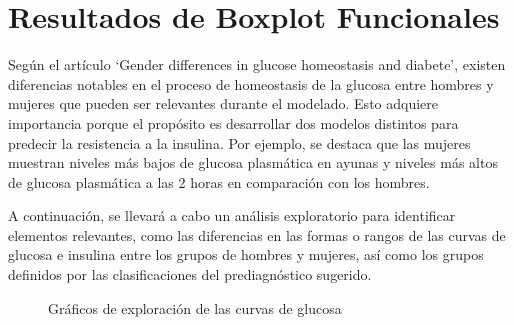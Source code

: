 \section{Resultados de Boxplot Funcionales}

Según el artículo `Gender differences in glucose homeostasis and diabete'\cite{GenderDifferences2018}, existen diferencias notables en el proceso de homeostasis de la glucosa entre hombres y mujeres que pueden ser relevantes durante el modelado. Esto adquiere importancia porque el propósito es desarrollar dos modelos distintos para predecir la resistencia a la insulina. Por ejemplo, se destaca que las mujeres muestran niveles más bajos de glucosa plasmática en ayunas y niveles más altos de glucosa plasmática a las 2 horas en comparación con los hombres.

A continuación, se llevará a cabo un análisis exploratorio para identificar elementos relevantes, como las diferencias en las formas o rangos de las curvas de glucosa e insulina entre los grupos de hombres y mujeres, así como los grupos definidos por las clasificaciones del prediagnóstico sugerido.



\begin{figure}[H]
 \centering
    \caption{Gráficos de exploración de las curvas de glucosa}
    \label{fig:glucosa}
\end{figure}



